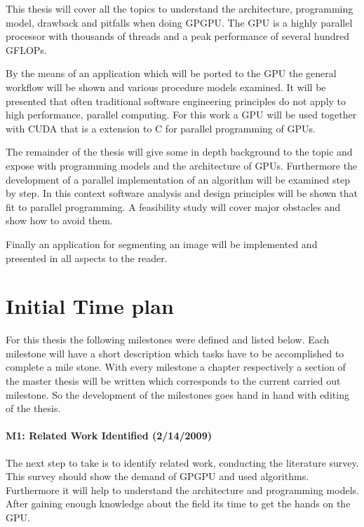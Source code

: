 This thesis will cover all the topics to understand the architecture,
programming model, drawback and pitfalls when doing \gls{GPGPU}. The \gls{GPU}
is a highly parallel processor with thousands of threads and a peak performance
of several hundred \glspl{GFLOP}.

By the means of an application which will be ported to the \gls{GPU} the general
workflow will be shown and various procedure models examined. It will be
presented that often traditional software engineering principles do not apply to
high performance, parallel computing. For this work a  \gls{GPU}
will be used together with \gls{CUDA} that is a extension to C for parallel
programming of \glspl{GPU}.

The remainder of the thesis will give some in depth background to the topic and
expose with programming models and the architecture of \glspl{GPU}. Furthermore the
development of a parallel implementation of an algorithm will be examined step
by step. In this context software analysis and design principles will be shown
that fit to parallel programming. A feasibility study will cover major obstacles
and show how to avoid them.

Finally an application for segmenting an image will be implemented and presented
in all aspects to the reader.

\section{Initial Time plan} 
\label{sub:time_plan} 
For this thesis the following milestones were defined and listed below. Each
milestone will have a short description which tasks have to be accomplished to
complete a mile stone. With every milestone a chapter respectively a section of
the master thesis will be written which corresponds to the current carried out
milestone. So the development of the milestones goes hand in hand with editing
of the thesis.

\paragraph{M1: Related Work Identified (2/14/2009)} %
\label{par:m1_related_work_identified}
The next step to take is to identify related work, conducting the literature 
survey. This survey should show the demand of GPGPU and used algorithms. 
Furthermore it will help to understand the architecture and programming models. 
After gaining enough knowledge about the field its time to get the hands on the 
GPU.
